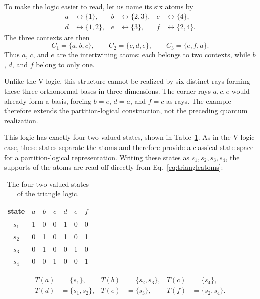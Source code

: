 \documentclass[
  10pt,
  twocolumn,
  aps,
  pra,
  showkeys,
  amsmath,amssymb,
  longbibliography
]{revtex4-2}
\begin{document}
To make the logic easier to read, let us name its six atoms by
\begin{align}
a &\leftrightarrow \{1\},
&
b &\leftrightarrow \{2,3\},
&
c &\leftrightarrow \{4\},
\nonumber\\
d &\leftrightarrow \{1,2\},
&
e &\leftrightarrow \{3\},
&
f &\leftrightarrow \{2,4\}.
\label{eq:triangleatoms}
\end{align}
The three contexts are then
\begin{equation}
C_1=\{a,b,c\},
\qquad
C_2=\{c,d,e\},
\qquad
C_3=\{e,f,a\}.
\end{equation}
Thus \(a\), \(c\), and \(e\) are the intertwining atoms: each belongs to two contexts, while \(b\), \(d\), and \(f\) belong to only one.

Unlike the V-logic, this structure cannot be realized by six distinct rays forming these three orthonormal bases in three dimensions. The corner rays \(a,c,e\) would already form a basis, forcing \(b=e\), \(d=a\), and \(f=c\) as rays. The example therefore extends the partition-logical construction, not the preceding quantum realization.

This logic has exactly four two-valued states, shown in Table~\ref{tab:trianglestates}. As in the V-logic case, these states separate the atoms and therefore provide a classical state space for a partition-logical representation. Writing these states as \(s_1,s_2,s_3,s_4\), the supports of the atoms are read off directly from Eq.~\eqref{eq:triangleatoms}:

\begin{table}[t]
\caption{The four two-valued states of the triangle logic.}
\label{tab:trianglestates}
\begin{ruledtabular}
\begin{tabular}{c c c c c c c}
state & \(a\) & \(b\) & \(c\) & \(d\) & \(e\) & \(f\) \\
\hline
\(s_1\) & 1 & 0 & 0 & 1 & 0 & 0 \\
\(s_2\) & 0 & 1 & 0 & 1 & 0 & 1 \\
\(s_3\) & 0 & 1 & 0 & 0 & 1 & 0 \\
\(s_4\) & 0 & 0 & 1 & 0 & 0 & 1 \\
\end{tabular}
\end{ruledtabular}
\end{table}

\begin{align}
T(a)&=\{s_1\},
&
T(b)&=\{s_2,s_3\},
&
T(c)&=\{s_4\},
\nonumber\\
T(d)&=\{s_1,s_2\},
&
T(e)&=\{s_3\},
&
T(f)&=\{s_2,s_4\}.
\label{eq:trianglesupports}
\end{align}
\end{document}
